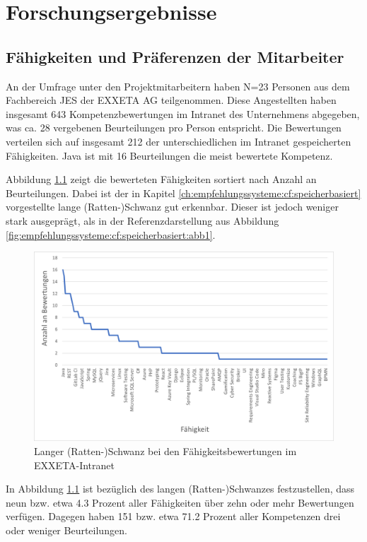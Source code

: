 \chapter{Forschungsergebnisse}
\label{ch:ergebnisse}

\section{Fähigkeiten und Präferenzen der Mitarbeiter}
\label{ch:ergebnisse:analyse}
An der Umfrage unter den Projektmitarbeitern haben N=23 Personen aus dem Fachbereich \acl{JES} der EXXETA AG teilgenommen. Diese Angestellten haben insgesamt 643 Kompetenzbewertungen im Intranet des Unternehmens abgegeben, was ca. 28 vergebenen Beurteilungen pro Person entspricht. Die Bewertungen verteilen sich auf insgesamt 212 der \anzFaehigkeiten unterschiedlichen im Intranet gespeicherten Fähigkeiten. Java ist mit 16 Beurteilungen die meist bewertete Kompetenz.

Abbildung \ref{fig:ergebnisse:analyse:abb1} zeigt die bewerteten Fähigkeiten sortiert nach Anzahl an Beurteilungen. Dabei ist der in Kapitel \ref{ch:empfehlungssysteme:cf:speicherbasiert} vorgestellte lange (Ratten-)Schwanz gut erkennbar. Dieser ist jedoch weniger stark ausgeprägt, als in der Referenzdarstellung aus Abbildung \ref{fig:empfehlungssysteme:cf:speicherbasiert:abb1}.

\begin{figure}[h]
	\centering
	\includegraphics[width=1\textwidth]{gfx/long-tail-intranet.png}
	\caption{Langer (Ratten-)Schwanz bei den Fähigkeitsbewertungen im EXXETA-Intranet}
	\label{fig:ergebnisse:analyse:abb1}
\end{figure}

In Abbildung \ref{fig:ergebnisse:analyse:abb1} ist bezüglich des langen (Ratten-)Schwanzes festzustellen, dass neun bzw. etwa 4.3 Prozent aller Fähigkeiten über zehn oder mehr Bewertungen verfügen. Dagegen haben 151 bzw. etwa 71.2 Prozent aller Kompetenzen drei oder weniger Beurteilungen.

